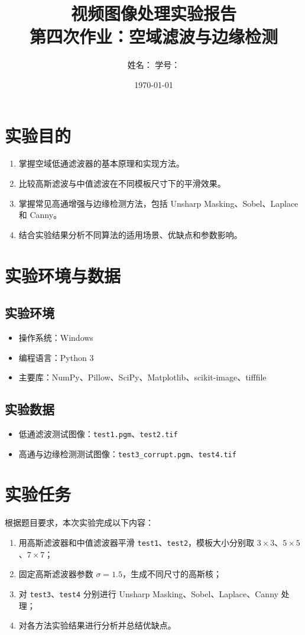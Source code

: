 \documentclass[UTF8,a4paper,12pt]{ctexart}
\title{视频图像处理实验报告\\第四次作业：空域滤波与边缘检测}
\author{姓名：\underline{\hspace{3cm}} \quad 学号：\underline{\hspace{3cm}}}
\date{\today}
\begin{document}
\maketitle
\tableofcontents
\newpage

\section{实验目的}
\begin{enumerate}
  \item 掌握空域低通滤波器的基本原理和实现方法。
  \item 比较高斯滤波与中值滤波在不同模板尺寸下的平滑效果。
  \item 掌握常见高通增强与边缘检测方法，包括 Unsharp Masking、Sobel、Laplace 和 Canny。
  \item 结合实验结果分析不同算法的适用场景、优缺点和参数影响。
\end{enumerate}

\section{实验环境与数据}
\subsection{实验环境}
\begin{itemize}
  \item 操作系统：Windows
  \item 编程语言：Python 3
  \item 主要库：NumPy、Pillow、SciPy、Matplotlib、scikit-image、tifffile
\end{itemize}

\subsection{实验数据}
\begin{itemize}
  \item 低通滤波测试图像：\texttt{test1.pgm}、\texttt{test2.tif}
  \item 高通与边缘检测测试图像：\texttt{test3\_corrupt.pgm}、\texttt{test4.tif}
\end{itemize}

\section{实验任务}
根据题目要求，本次实验完成以下内容：
\begin{enumerate}
  \item 用高斯滤波器和中值滤波器平滑 \texttt{test1}、\texttt{test2}，模板大小分别取 $3\times3$、$5\times5$、$7\times7$；
  \item 固定高斯滤波器参数 $\sigma=1.5$，生成不同尺寸的高斯核；
  \item 对 \texttt{test3}、\texttt{test4} 分别进行 Unsharp Masking、Sobel、Laplace、Canny 处理；
  \item 对各方法实验结果进行分析并总结优缺点。
\end{enumerate}
\end{document}
